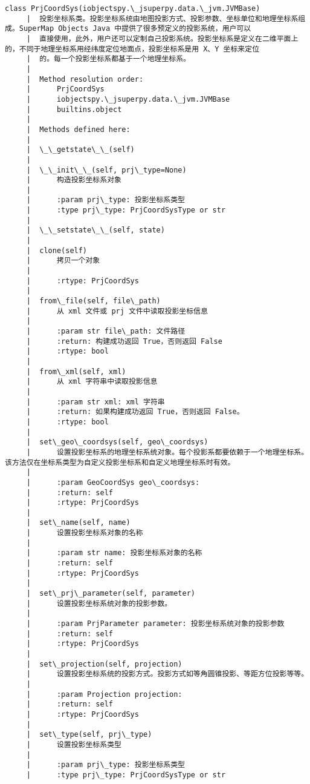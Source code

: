\documentclass[11pt]{article}
\begin{document}
\begin{Verbatim}[commandchars=\\\{\}]
    class PrjCoordSys(iobjectspy.\_jsuperpy.data.\_jvm.JVMBase)
     |  投影坐标系类。投影坐标系统由地图投影方式、投影参数、坐标单位和地理坐标系组成。SuperMap Objects Java 中提供了很多预定义的投影系统，用户可以
     |  直接使用，此外，用户还可以定制自己投影系统。投影坐标系是定义在二维平面上的，不同于地理坐标系用经纬度定位地面点，投影坐标系是用 X、Y 坐标来定位
     |  的。每一个投影坐标系都基于一个地理坐标系。
     |  
     |  Method resolution order:
     |      PrjCoordSys
     |      iobjectspy.\_jsuperpy.data.\_jvm.JVMBase
     |      builtins.object
     |  
     |  Methods defined here:
     |  
     |  \_\_getstate\_\_(self)
     |  
     |  \_\_init\_\_(self, prj\_type=None)
     |      构造投影坐标系对象
     |      
     |      :param prj\_type: 投影坐标系类型
     |      :type prj\_type: PrjCoordSysType or str
     |  
     |  \_\_setstate\_\_(self, state)
     |  
     |  clone(self)
     |      拷贝一个对象
     |      
     |      :rtype: PrjCoordSys
     |  
     |  from\_file(self, file\_path)
     |      从 xml 文件或 prj 文件中读取投影坐标信息
     |      
     |      :param str file\_path: 文件路径
     |      :return: 构建成功返回 True，否则返回 False
     |      :rtype: bool
     |  
     |  from\_xml(self, xml)
     |      从 xml 字符串中读取投影信息
     |      
     |      :param str xml: xml 字符串
     |      :return: 如果构建成功返回 True，否则返回 False。
     |      :rtype: bool
     |  
     |  set\_geo\_coordsys(self, geo\_coordsys)
     |      设置投影坐标系的地理坐标系统对象。每个投影系都要依赖于一个地理坐标系。该方法仅在坐标系类型为自定义投影坐标系和自定义地理坐标系时有效。
     |      
     |      :param GeoCoordSys geo\_coordsys:
     |      :return: self
     |      :rtype: PrjCoordSys
     |  
     |  set\_name(self, name)
     |      设置投影坐标系对象的名称
     |      
     |      :param str name: 投影坐标系对象的名称
     |      :return: self
     |      :rtype: PrjCoordSys
     |  
     |  set\_prj\_parameter(self, parameter)
     |      设置投影坐标系统对象的投影参数。
     |      
     |      :param PrjParameter parameter: 投影坐标系统对象的投影参数
     |      :return: self
     |      :rtype: PrjCoordSys
     |  
     |  set\_projection(self, projection)
     |      设置投影坐标系统的投影方式。投影方式如等角圆锥投影、等距方位投影等等。
     |      
     |      :param Projection projection:
     |      :return: self
     |      :rtype: PrjCoordSys
     |  
     |  set\_type(self, prj\_type)
     |      设置投影坐标系类型
     |      
     |      :param prj\_type: 投影坐标系类型
     |      :type prj\_type: PrjCoordSysType or str

\end{Verbatim}
\end{document}
